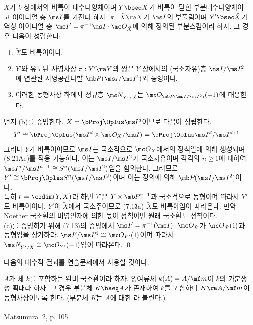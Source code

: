 	
	\begin{theorem}
	$X$가 $k$ 상에서의 비특이 대수다양체이며 $Y\bseq X$가 비특이 닫힌 부분대수다양체이고 아이디얼 층 $\ms I$를 가진다 하자.
	$\pi:\tilde X\ra X$가 $\ms I$의 부풀림이며 $Y'\bseq\tilde X$가
	역상 아이디얼 층 $\ms I'=\pi^{-1}\ms I\cdot\mc O_{\tilde X}$에 의해 정의된 부분스킴이라 하자. 그 경우 다음이 성립한다:
	\begin{enumerate}[label=(\alph*)]
	\item $\tilde X$도 비특이이다.
	\item $Y'$와 유도된 사영사상 $\pi:Y'\ra Y$의 쌍은 $Y$ 상에서의 (국소자유)층
	$\ms I/\ms I^2$에 연관된 사영공간다발 $\mb P(\ms I/\ms I^2)$와 동형이다.
	\item 이러한 동형사상 하에서 정규층 $\ms N_{Y'/\tilde X}$는 $\mc O_{\mb P(\ms I/\ms I^2)}(-1)$에 대응한다.\\
	\end{enumerate}
	\pf 먼저 (b)를 증명한다. $\tilde X=\bProj\Oplus\ms I^d$이므로 다음이 성립한다.
	$$Y'\cong\bProj\Oplus(\ms I^d\otimes\mc O_X/\ms I)=\bProj\Oplus\ms I^d/\ms I^{d+1}$$
	그러나 $Y$가 비특이이므로 $\ms I$는 국소적으로 $\mc O_X$에서의 정칙열에 의해 생성되며 (8.21Ae)를 적용 가능하다.
	이는 $\ms I/\ms I^2$가 국소자유이며 각각의 $n\ge 1$에 대하여 $\ms I^n/\ms I^{n+1}\cong S^n(\ms I/\ms I^2)$임을 함의한다.
	그러므로 $Y'\cong\bProj\Oplus S^n(\ms I/\ms I^2)$이며 이는 정의에 의해 $\mb P(\ms I/\ms I^2)$이다.\\
	특히 $r=\codim(Y,X)$라 하면 $Y'$은 $Y\times\mb P^{r-1}$과 국소적으로 동형이며 따라서 $Y'$도 비특이이다.
	$Y'$이 $\tilde X$에서 국소주이므로 (7.13a) $\tilde X$도 비특이임이 따라온다:
	만약 Noether 국소환의 비영인자에 의한 몫이 정칙이면 원래 국소환도 정칙이다.\\
	(c)를 증명하기 위해 (7.13)의 증명에서 $\ms I'=\pi^{-1}(\ms I)\cdot\mc O_{\tilde X}$가 $\mc O_{\tilde X}(1)$과 동형임을 상기하라.
	$\ms I'/\ms I'^2\cong\mc O_{Y'}(1)$이며 따라서 $\ms N_{Y'/\tilde X}\cong\mc O_{Y'}(-1)$임이 따라온다.
	\qed
	\end{theorem}
	
	다음의 대수적 결과를 연습문제에서 사용할 것이다.
	
	\begin{theorema}[I. S. Cohen]
	$A$가 체 $k$를 포함하는 완비 국소환이라 하자. 잉여류체 $k(A)=A/\mf m$이 $k$의 가분생성 확대라 하자.
	그 경우 부분체 $K\bseq A$가 존재하여 $k$를 포함하며 $K\ra A/\mf m$이 동형사상이도록 한다.
	(부분체 $K$는 $A$에 대한 라 불린다.)\\\\
	\pf Matsumura [2, p. 105]
	\end{theorema}
	
